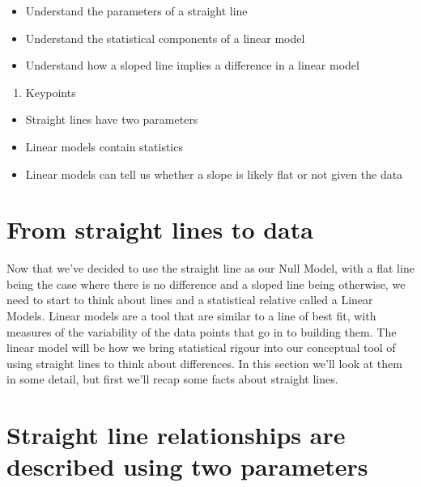 \documentclass[
]{book}
\providecommand{\tightlist}{%
  \setlength{\itemsep}{0pt}\setlength{\parskip}{0pt}}
\begin{document}
\begin{itemize}
\tightlist
\item
  Understand the parameters of a straight line
\item
  Understand the statistical components of a linear model
\item
  Understand how a sloped line implies a difference in a linear model
\end{itemize}

\begin{enumerate}
\def\labelenumi{\arabic{enumi}.}
\setcounter{enumi}{2}
\tightlist
\item
  Keypoints
\end{enumerate}

\begin{itemize}
\tightlist
\item
  Straight lines have two parameters
\item
  Linear models contain statistics
\item
  Linear models can tell us whether a slope is likely flat or not given the data
\end{itemize}

\hypertarget{from-straight-lines-to-data}{%
\section{From straight lines to data}\label{from-straight-lines-to-data}}

Now that we've decided to use the straight line as our Null Model, with a flat line being the case where there is no difference and a sloped line being otherwise, we need to start to think about lines and a statistical relative called a Linear Models. Linear models are a tool that are similar to a line of best fit, with measures of the variability of the data points that go in to building them. The linear model will be how we bring statistical rigour into our conceptual tool of using straight lines to think about differences. In this section we'll look at them in some detail, but first we'll recap some facts about straight lines.

\hypertarget{straight-line-relationships-are-described-using-two-parameters}{%
\section{Straight line relationships are described using two parameters}\label{straight-line-relationships-are-described-using-two-parameters}}
\end{document}
